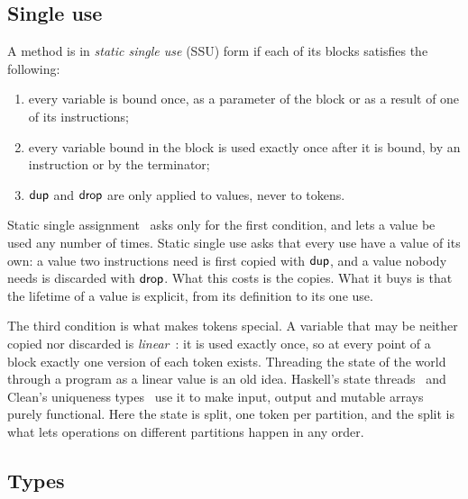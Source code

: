\subsection{Single use}

\begin{definition}\label{def:ee-ssu}
A method is in \emph{static single use} (SSU) form if each of its blocks
satisfies the following:
\begin{enumerate}
\item every variable is bound once, as a parameter of the block or as a result
  of one of its instructions;
\item every variable bound in the block is used exactly once after it is bound,
  by an instruction or by the terminator;
\item $\mathsf{dup}$ and $\mathsf{drop}$ are only applied to values, never to tokens.
\end{enumerate}
\end{definition}

Static single assignment~\cite{cytron1991ssa} asks only for the first condition,
and lets a value be used any number of times. Static single use asks that every
use have a value of its own: a value two instructions need is first copied
with $\mathsf{dup}$, and a value nobody needs is discarded with $\mathsf{drop}$. What this costs
is the copies. What it buys is that the lifetime of a value is explicit, from
its definition to its one use.

The third condition is what makes tokens special. A variable that may be
neither copied nor discarded is \emph{linear}~\cite{girard1987linear,
wadler1990linear}: it is used exactly once, so at every point of a block
exactly one version of each token exists. Threading the state of the world
through a program as a linear value is an old idea. Haskell's state
threads~\cite{launchbury1994state} and Clean's uniqueness
types~\cite{barendsen1996uniqueness} use it to make input, output and mutable
arrays purely functional. Here the state is split, one token per partition,
and the split is what lets operations on different partitions happen in any
order.

\subsection{Types}

